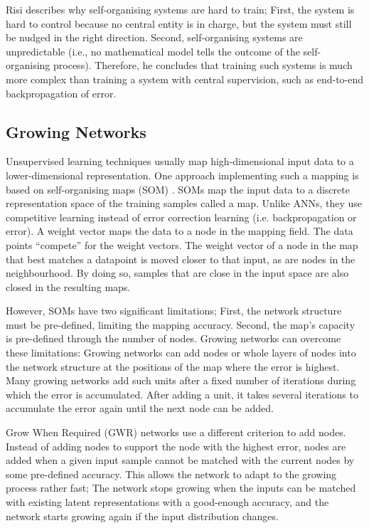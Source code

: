 Risi  describes why self-organising systems are hard to train;
First, the system is hard to control because no central entity is in charge, but the system must still be nudged in the right direction.
Second, self-organising systems are unpredictable (i.e., no mathematical model tells the outcome of the self-organising process).
Therefore, he concludes that training such systems is much more complex than training a system with central supervision, such as end-to-end backpropagation of error.


\subsection{Growing Networks}
Unsupervised learning techniques usually map high-dimensional input data to a lower-dimensional representation.
One approach implementing such a mapping is based on self-organising maps (SOM) .
SOMs map the input data to a discrete representation space of the training samples called a map.
Unlike ANNs, they use competitive learning instead of error correction learning (i.e. backpropagation or error).
A weight vector maps the data to a node in the mapping field.
The data points ``compete'' for the weight vectors.
The weight vector of a node in the map that best matches a datapoint is moved closer to that input, as are nodes in the neighbourhood.
By doing so, samples that are close in the input space are also closed in the resulting maps.

However, SOMs have two significant limitations; First, the network structure must be pre-defined, limiting the mapping accuracy. Second, the map's capacity is pre-defined through the number of nodes.
Growing networks can overcome these limitations:
Growing networks can add nodes or whole layers of nodes into the network structure at the positions of the map where the error is highest.
Many growing networks  add such units after a fixed number of iterations during which the error is accumulated.
After adding a unit, it takes several iterations to accumulate the error again until the next node can be added.

Grow When Required (GWR) networks  use a different criterion to add nodes.
Instead of adding nodes to support the node with the highest error, nodes are added when a given input sample cannot be matched with the current nodes by some pre-defined accuracy.
This allows the network to adapt to the growing process rather fast; The network stops growing when the inputs can be matched with existing latent representations with a good-enough accuracy, and the network starts growing again if the input distribution changes.

